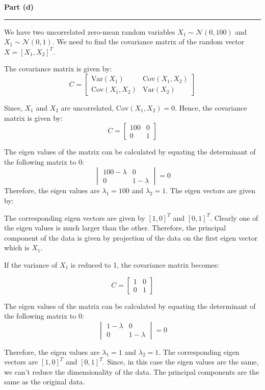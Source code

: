 \documentclass[a4paper,12pt]{article}
\newenvironment{solution}[2][]{%
    \begin{mdframed}[linecolor=blue!70!black, linewidth=2pt, roundcorner=10pt, backgroundcolor=yellow!10!white, skipabove=12pt, skipbelow=12pt]%
        \textbf{\large #2}
        \par\noindent\rule{\textwidth}{0.4pt}
}{
    \end{mdframed}
}
\begin{document}
\begin{solution}{Part (d)}
We have two uncorrelated zero-mean random variables $X_1 \sim \mathcal{N}(0, 100)$ and $X_1 \sim \mathcal{N}(0, 1)$. We need to find the covariance matrix of the random vector $X = [X_1, X_2]^T$.

The covariance matrix is given by:
\begin{equation}
  C = \begin{bmatrix}
    \text{Var}(X_1) & \text{Cov}(X_1, X_2) \\
    \text{Cov}(X_1, X_2) & \text{Var}(X_2)
  \end{bmatrix}
\end{equation}

Since, $X_1$ and $X_2$ are uncorrelated, $\text{Cov}(X_1, X_2) = 0$. Hence, the covariance matrix is given by:
\begin{equation}
  C = \begin{bmatrix}
    100 & 0 \\
    0 & 1
  \end{bmatrix}
\end{equation}

The eigen values of the matrix can be calculated by equating the determinant of the following matrix to 0:
\begin{equation}
  \begin{vmatrix}
    100-\lambda & 0 \\
    0 & 1-\lambda
  \end{vmatrix} = 0
\end{equation}
Therefore, the eigen values are $\lambda_1 = 100$ and $\lambda_2 = 1$. The eigen vectors are given by:

The corresponding eigen vectors are given by $[1, 0]^T$ and $[0, 1]^T$. Clearly one of the eigen values is much larger than the other. Therefore, the principal component of the data is given by projection of the data on the first eigen vector which is $X_1$.


If the variance of $X_1$ is reduced to 1, the covariance matrix becomes:

\begin{equation}
  C = \begin{bmatrix}
    1 & 0 \\
    0 & 1
  \end{bmatrix}
\end{equation}

The eigen values of the matrix can be calculated by equating the determinant of the following matrix to 0:
\begin{equation}
  \begin{vmatrix}
    1-\lambda & 0 \\
    0 & 1-\lambda
  \end{vmatrix} = 0
\end{equation}

Therefore, the eigen values are $\lambda_1 = 1$ and $\lambda_2 = 1$. The corresponding eigen vectors are $[1, 0]^T$ and $[0, 1]^T$. Since, in this case the eigen values are the same, we can't reduce the dimensionality of the data. The principal components are the same as the original data.  
\end{solution}
\end{document}
